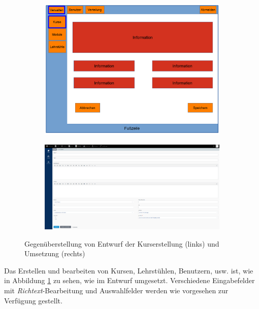         \begin{figure}
            \centering
            \begin{subfigure}{0.4\textwidth}
                \includegraphics[width=1.0\textwidth]{./implementation/images/MockUpsBackend/backendEdit.png}
            \end{subfigure}
            \begin{subfigure}{0.59\textwidth}
                \includegraphics[width=1.0\textwidth]{./implementation/images/edit.png}
            \end{subfigure}
            \caption{Gegenüberstellung von Entwurf der Kurserstellung (links) und Umsetzung (rechts)}
            \label{fig:comparisonEdit}
        \end{figure}
    
        Das Erstellen und bearbeiten von Kursen, Lehrstühlen, Benutzern, usw. ist, wie in Abbildung \ref{fig:comparisonEdit} zu sehen, wie im Entwurf umgesetzt.
        Verschiedene Eingabefelder mit \textit{Richtext}-Bearbeitung und Auswahlfelder werden wie vorgesehen zur Verfügung gestellt.
    
